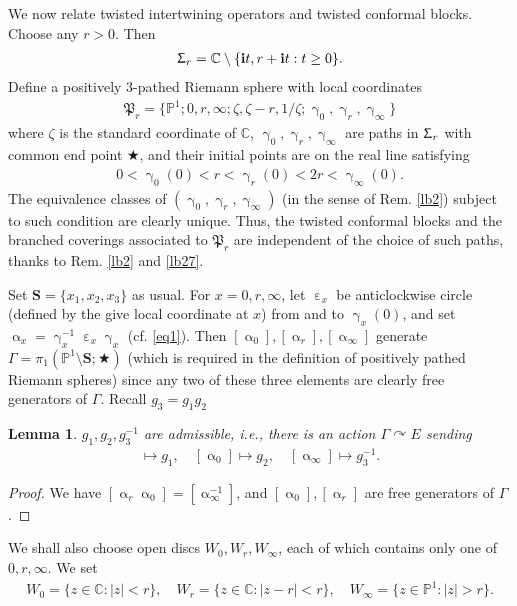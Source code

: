 \documentclass[11pt,b5paper,notitlepage]{article}
\theoremstyle{definition}
\theoremstyle{plain}
\newtheorem{lm}[df]{Lemma}
\newcommand{\fk}{\mathfrak}
\newcommand{\im}{\mathbf{i}}
\newcommand{\Cbb}{\mathbb C}
\newcommand{\Pbb}{\mathbb P}
\newcommand{\Sbf}{\mathbf{S}}
\numberwithin{equation}{subsection}
\begin{document}
We now relate twisted intertwining operators and twisted conformal blocks. Choose any $r>0$. Then
\begin{align*}
\Upsigma_r=\Cbb\setminus\{\im t,r+\im t:t\geq 0\}.	
\end{align*}
Define a positively $3$-pathed Riemann sphere with local coordinates
\begin{align*}
\fk P_r=\{\Pbb^1;0,r,\infty;\zeta,\zeta-r,1/\zeta;\upgamma_0,\upgamma_r,\upgamma_\infty\}	
\end{align*}
where $\zeta$ is the standard coordinate of $\Cbb$, $\upgamma_0,\upgamma_r,\upgamma_\infty$ are paths in $\Upsigma_r$ with common end point $\bigstar$, and their initial points are on the real line satisfying
\begin{align*}
0<\upgamma_0(0)<r<\upgamma_r(0)<2r<\upgamma_\infty(0).	
\end{align*}
The equivalence classes of  $(\upgamma_0,\upgamma_r,\upgamma_\infty)$ (in the sense of Rem. \ref{lb2}) subject to such condition are clearly unique. Thus, the  twisted conformal blocks and the branched coverings associated to $\fk P_r$ are independent of the choice of such paths, thanks to Rem. \ref{lb2} and \ref{lb27}.

Set $\Sbf=\{x_1,x_2,x_3\}$ as usual. For $x=0,r,\infty$, let $\upepsilon_x$ be anticlockwise circle (defined by the give local coordinate at $x$) from and to $\upgamma_x(0)$, and set  $\upalpha_x=\upgamma_x^{-1}\upepsilon_x\upgamma_x$ (cf. \eqref{eq1}). Then $[\upalpha_0],[\upalpha_r],[\upalpha_\infty]$ generate $\Gamma=\pi_1(\Pbb^1\setminus\Sbf;\bigstar)$ (which is required in the definition of positively pathed Riemann spheres) since any two of these three elements are clearly free generators  of $\Gamma$. Recall $g_3=g_1g_2$
\begin{lm}
$g_1,g_2,g_3^{-1}$ are admissible, i.e., there is an action $\Gamma\curvearrowright E$ sending
\begin{align*}
[\upalpha_r]\mapsto g_1,\quad [\upalpha_0]\mapsto g_2,\quad [\upalpha_\infty]\mapsto g_3^{-1}.	
\end{align*}
\end{lm}

\begin{proof}
We have $[\upalpha_r\upalpha_0]=[\upalpha_\infty^{-1}]$, and $[\upalpha_0],[\upalpha_r]$ are free generators of $\Gamma$.
\end{proof}


We shall also choose open discs $W_0,W_r,W_\infty$, each of which contains only one of $0,r,\infty$. We set
\begin{align*}
W_0=\{z\in\Cbb:|z|<r\},\quad W_r=\{z\in\Cbb:|z-r|<r\},\quad W_\infty=\{z\in\Pbb^1:|z|>r\}.
\end{align*}
\end{document}
